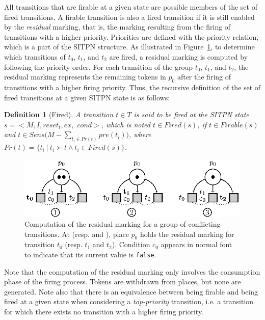 \documentclass[pdflatex,sn-mathphys]{sn-jnl}%
\theoremstyle{thmstyleone}%
\theoremstyle{thmstyletwo}%
\theoremstyle{thmstylethree}%
\newtheorem{definition}{Definition}%
\begin{document}
All transitions that are firable at a given state are possible members
of the set of fired transitions. A firable transition is also a fired
transition if it is still enabled by the \textit{residual} marking,
that is, the marking resulting from the firing of transitions with a
higher priority.  Priorities are defined with the priority relation,
which is a part of the SITPN structure.  As illustrated in
Figure~\ref{fig:resid-marking}, to determine which transitions of
$t_0$, $t_1$, and $t_2$ are fired, a residual marking is computed by
following the priority order. For each transition of the group $t_0$,
$t_1$, and $t_2$, the residual marking represents the remaining tokens
in $p_0$ after the firing of transitions with a higher firing
priority.  Thus, the recursive definition of the set of fired
transitions at a given SITPN state is as follows:

\begin{definition}[Fired]
  \label{def:fired}
  A transition $t\in{}T$ is said to be fired at the SITPN state
  $s={<}M,I,reset_t,ex,$ $cond{>}$, which is noted $t\in{}Fired(s)$,
  if $t\in{}Firable(s)$ and
  $t\in{}Sens\big(M-\sum\limits_{t_i\in{}Pr(t)}pre(t_i)\big)$, where
  $Pr(t)=\{t_i~|~t_i\succ{}t\wedge{}t_i\in{}Fired(s)\}$.
\end{definition}


\begin{figure}[H]
  \centering
  \includegraphics[keepaspectratio=true, width=.7\textwidth]{resid-marking.eps}
  \caption[Computation of the residual marking of a group of
  conflicting transitions.]{Computation of the residual marking for a
    group of conflicting transitions. At 
    (resp.  and ), place $p_0$ holds the
    residual marking for transition $t_0$ (resp. $t_1$ and
    $t_2$). Condition $c_0$ appears in normal font to indicate that
    its current value is \texttt{false}.}
  \label{fig:resid-marking}
\end{figure}

Note that the computation of the residual marking only involves the
consumption phase of the firing process. Tokens are withdrawn from
places, but none are generated. Note also that there is an equivalence
between being firable and being fired at a given state when
considering a \textit{top-priority} transition, i.e. a transition for
which there exists no transition with a higher firing priority.
\end{document}
